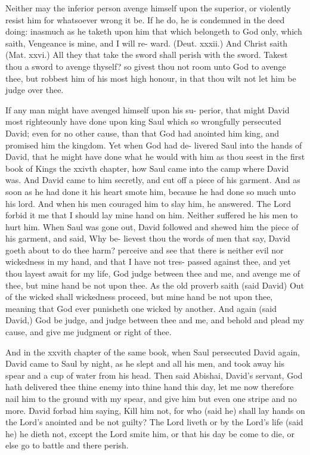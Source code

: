 \documentclass{custom}
\begin{document}
Neither may the inferior person avenge himself upon 
the superior, or violently resist him for whatsoever wrong 
it be. If he do, he is condemned in the deed doing: 
inasmuch as he taketh upon him that which belongeth to 
God only, which saith, Vengeance is mine, and I will re- 
ward. (Deut. xxxii.) And Christ saith (Mat. xxvi.) All 
they that take the sword shall perish with the sword. 
Takest thou a sword to avenge thyself? so givest thou not 
room unto God to avenge thee, but robbest him of his 
most high honour, in that thou wilt not let him be judge 
over thee. 

If any man might have avenged himself upon his su- 
perior, that might David most righteounly have done upon
king Saul which so wrongfully persecuted David; even 
for no other cause, than that God had anointed him king, 
and promised him the kingdom. Yet when God had de- 
livered Saul into the hands of David, that he might have 
done what he would with him as thou seest in the first book 
of Kings the xxivth chapter, how Saul came into the camp 
where David was. And David came to him secretly, and 
cut off a piece of his garment. And as soon as he had 
done it his heart smote him, because he had done so much 
unto his lord. And when his men couraged him to slay 
him, he answered. The Lord forbid it me that I should 
lay mine hand on him. Neither suffered he his men to 
hurt him. When Saul was gone out, David followed and 
shewed him the piece of his garment, and said, Why be- 
lievest thou the words of men that say, David goeth about 
to do thee harm? perceive and see that there is neither 
evil nor wickedness in my hand, and that I have not tres- 
passed against thee, and yet thou layest await for my life, 
God judge between thee and me, and avenge me of thee, 
but mine hand be not upon thee. As the old proverb saith 
(said David) Out of the wicked shall wickedness proceed, 
but mine hand be not upon thee, meaning that God ever 
punisheth one wicked by another. And again (said David,) 
God be judge, and judge between thee and me, and 
behold and plead my cause, and give me judgment or right 
of thee. 

And in the xxvith chapter of the same book, when Saul 
persecuted David again, David came to Saul by night, 
as he slept and all his men, and took away his spear and a 
cup of water from his head. Then said Abishai, David's
servant, God hath delivered thee thine enemy into thine 
hand this day, let me now therefore nail him to the ground 
with my spear, and give him but even one stripe and no 
more. David forbad him saying, Kill him not, for who 
(said he) shall lay hands on the Lord's anointed and be 
not guilty? The Lord liveth or by the Lord's life (said he) 
he dieth not, except the Lord smite him, or that his day be 
come to die, or else go to battle and there perish.
\end{document}
